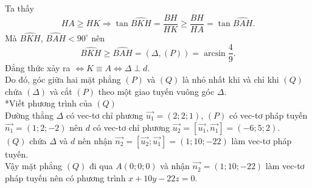 \begin{ex}
{Ta thấy
$$
	HA \geq HK 
	\Rightarrow 
	\tan \widehat{BKH}=\dfrac{BH}{HK}
		\geq
			\dfrac{BH}{HA}=\tan \widehat{BAH}.
$$
Mà $\widehat{BKH}$, $\widehat{BAH}<90^{\circ}$ nên
$$
	\widehat{BKH} \geq \widehat{BAH}=(\Delta,(P))=\arcsin \dfrac{4}{9}.
$$
Đẳng thức xảy ra $\Leftrightarrow K \equiv A \Leftrightarrow \Delta \perp d$.
\\
Do đó, góc giữa hai mặt phẳng $(P)$ và $(Q)$ là nhỏ nhất khi và chỉ khi $(Q)$ chứa $(\Delta)$ và cắt $(P)$ theo một giao tuyến vuông góc $\Delta$.
\\
*Viết phương trình của $(Q)$
\\
Đường thẳng $\Delta$ có vec-tơ chỉ phương $\vec{u_1}=(2 ; 2 ; 1)$, $(P)$ có vec-tơ pháp tuyến $\vec{n_1}=(1 ; 2 ;-2)$ nên $d$ có vec-tơ chỉ phương $\vec{u_2}=\left[\vec{u_1}, \vec{n_1}\right]=(-6 ; 5 ; 2)$.
\\
$(Q)$ chứa $\Delta$ và $d$ nên nhận $\vec{n_2}=\left[\vec{u_2} ; \vec{u_1}\right]=(1 ; 10 ;-22)$ làm vec-tơ pháp tuyến.
\\
Vậy mặt phẳng $(Q)$ đi qua $A(0 ; 0 ; 0)$ và nhận $\vec{n_2}=(1 ; 10 ;-22)$ làm vec-tơ pháp tuyến nên có phương trình $x+10 y-22 z=0$.
}
\end{ex}

